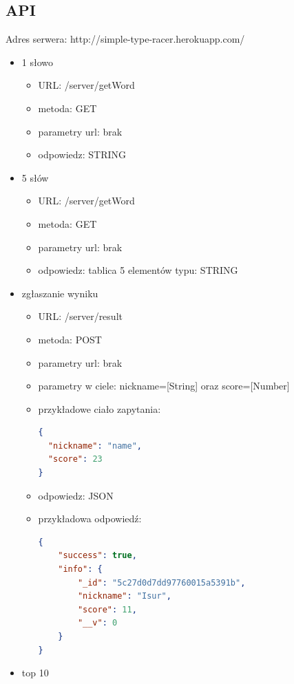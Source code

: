 \documentclass[12pt,a4paper]{article}
\begin{document}
\subsection{API}
Adres serwera: http://simple-type-racer.herokuapp.com/
\begin{itemize}
    \item 1 słowo
    \begin{itemize}
        \item URL: /server/getWord
        \item metoda: GET
        \item parametry url: brak
        \item odpowiedz: STRING
    \end{itemize}
    \item 5 słów
    \begin{itemize}
        \item URL: /server/getWord
        \item metoda: GET
        \item parametry url: brak
        \item odpowiedz: tablica 5 elementów typu: STRING
    \end{itemize}
    \item zgłaszanie wyniku
    \begin{itemize}
        \item URL: /server/result
        \item metoda: POST
        \item parametry url: brak
        \item parametry w ciele: nickname=[String] oraz score=[Number]
        \item przykładowe ciało zapytania:
                        \begin{lstlisting}[language=json,firstnumber=1]
{
  "nickname": "name",
  "score": 23
}
\end{lstlisting}
        \item odpowiedz: JSON
        \item przykładowa odpowiedź:
                \begin{lstlisting}[language=json,firstnumber=1]
{
    "success": true,
    "info": {
        "_id": "5c27d0d7dd97760015a5391b",
        "nickname": "Isur",
        "score": 11,
        "__v": 0
    }
}
\end{lstlisting}
    \end{itemize}
    \item top 10
    \begin{itemize}

\end{itemize}
\end{itemize}
\end{document}

